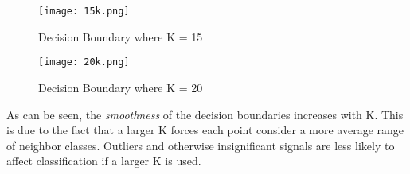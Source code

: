 \documentclass[12pt]{article}
\begin{document}
\begin{figure}[h!]
  \caption{Decision Boundary where K = 15}
  \centering
    \texttt{[image: 15k.png]}
\end{figure}

\begin{figure}[h!]
  \caption{Decision Boundary where K = 20}
  \centering
    \texttt{[image: 20k.png]}
\end{figure}

As can be seen, the \textit{smoothness} of the decision boundaries increases with K. This is due to the fact that a larger K forces each point consider a more average range of neighbor classes. Outliers and otherwise insignificant signals are less likely to affect classification if a larger K is used.
\end{document}
